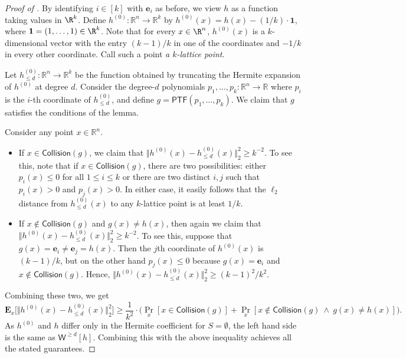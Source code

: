 \documentclass{toc}
\begin{document}
\begin{proof}[Proof of ]
    By identifying $i \in [k]$ with $\mathbf{e}_i$ as before, we view $h$ as a
    function taking values in $\R^k$. Define $h^{(0)} : \mathbb{R}^n
    \rightarrow \mathbb{R}^k $ by $h^{(0)} (x) = h(x) -({1}/{k}) \cdot
    \mathbf{1}$, where $\mathbf{1} = (1, \ldots, 1) \in \R^k$. Note that for
    every $x \in \R^n$, $h^{(0)}(x)$
    is a $k$-dimensional vector with
    the entry $(k-1)/k$ in one of the coordinates and $-1/k$ in every other
    coordinate. Call such a point \emph{a $k$-lattice point}.  

Let $h^{(0)}_{\le d} : \mathbb{R}^n \rightarrow \mathbb{R}^k$ be the function
obtained by truncating the Hermite expansion of $h^{(0)}$ at degree $d$.
Consider the degree-$d$ polynomials $p_1, \ldots, p_k: \mathbb{R}^n \rightarrow
\mathbb{R}$ where $p_i$ is the $i$-{th} coordinate of $h^{(0)}_{\le d}$, and
define $g = \mathsf{PTF}(p_1, \ldots, p_k)$. We claim that $g$ satisfies
the conditions of the lemma.

Consider any point $x \in
\mathbb{R}^n$. 
\begin{itemize}
\item If $x \in \mathsf{Collision}(g)$, we claim that $\Vert h^{(0)} (x) -
    h^{(0)}_{\le d}(x)  \Vert_2^2 \ge k^{-2}$. To see this, note that if $x \in
    \mathsf{Collision}(g)$, there are two possibilities: either $p_i(x) \le 0$
    for all $1 \le i \le k$ or there are two distinct $i,j$ such that
    $p_i(x) > 0$ and $p_j(x) > 0$. In either case, it
    easily follows that the $\ell_2$ distance from
    $h^{(0)}_{\le d}(x)$ to any $k$-lattice point is at least $1/k$.

\item If $x \not \in \mathsf{Collision}(g)$ and $g(x) \neq  h(x)$, then again
    we claim that $\Vert h^{(0)} (x) - h^{(0)}_{\le d}(x)  \Vert_2^2 \ge
    k^{-2}$. To see this, suppose that $g(x) = \mathbf{e}_i \ne \mathbf{e}_j = h(x)$.
    Then the $j$th coordinate of $h^{(0)}(x)$ is $(k-1)/k$, but on the other hand
    $p_j(x) \le 0$ because $g(x) = \mathbf{e}_i$ and $x \not \in \mathsf{Collision}(g)$.
    Hence,
    $\Vert h^{(0)} (x) - h^{(0)}_{\le d}(x)\Vert_2^2 \ge {(k-1)^2}/{k^2}$. 
\end{itemize}
Combining these two, we get 
\[
\mathbf{E}_{x } \big[ \Vert h^{(0)} (x) - h^{(0)}_{\le d}(x)\Vert_2^2 \big] \geq \frac{1}{k^2} \cdot  \big( \Pr_{x } [x \in \mathsf{Collision}(g)] +  \Pr_{x } [x \not \in \mathsf{Collision}(g) \ \wedge \ g(x) \neq  h(x) ]\big). 
\]
As $h^{(0)}$ and $h$ differ only in the Hermite coefficient for $S = \emptyset$, the left hand side is the same as $ \mathsf{W}^{\ge d}[h]$. Combining this with the above inequality achieves all the stated guarantees. 
\end{proof}
\end{document}
